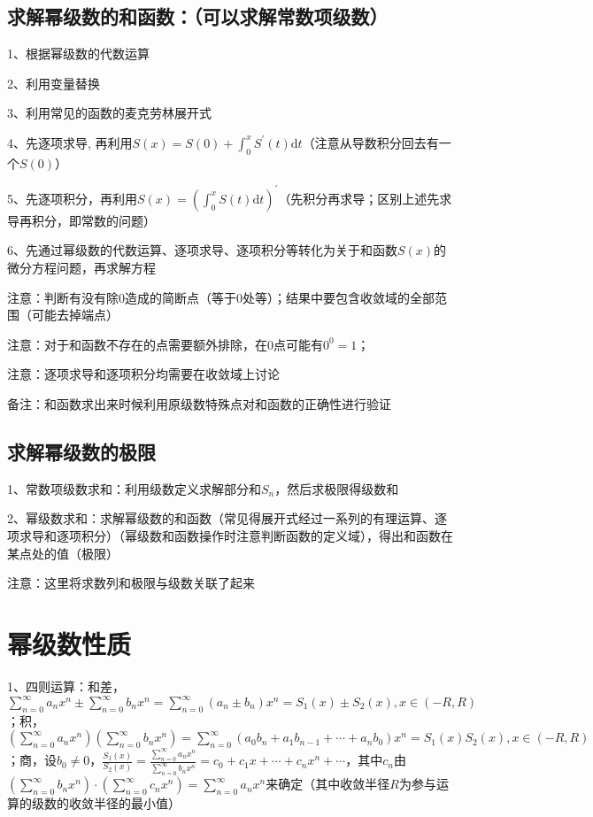 \subsection{求解幂级数的和函数：（可以求解常数项级数）}

1、根据幂级数的代数运算

2、利用变量替换

3、利用常见的函数的麦克劳林展开式

4、先逐项求导, 再利用$S(x)=S(0)+\int_{0}^{x} S^{\prime}(t) \mathrm{d} t$（注意从导数积分回去有一个$S(0)$）

5、先逐项积分，再利用$S(x)=\left(\int_{0}^{x} S(t) \mathrm{d} t\right)^{\prime}$（先积分再求导；区别上述先求导再积分，即常数的问题）

6、先通过幂级数的代数运算、逐项求导、逐项积分等转化为关于和函数$S(x)$的微分方程问题，再求解方程

注意：判断有没有除0造成的简断点（等于0处等）；结果中要包含收敛域的全部范围（可能去掉端点）

注意：对于和函数不存在的点需要额外排除，在0点可能有$0^0=1$；

注意：逐项求导和逐项积分均需要在收敛域上讨论

备注：和函数求出来时候利用原级数特殊点对和函数的正确性进行验证



\subsection{求解幂级数的极限}

1、常数项级数求和：利用级数定义求解部分和$S_n$，然后求极限得级数和

2、幂级数求和：求解幂级数的和函数（常见得展开式经过一系列的有理运算、逐项求导和逐项积分）（幂级数和函数操作时注意判断函数的定义域），得出和函数在某点处的值（极限）

注意：这里将求数列和极限与级数关联了起来

\section{幂级数性质}

1、四则运算：和差，$\sum_{n=0}^{\infty} a_{n} x^{n} \pm \sum_{n=0}^{\infty} b_{n} x^{n}=\sum_{n=0}^{\infty}\left(a_{n} \pm b_{n}\right) x^{n}=S_{1}(x) \pm S_{2}(x), x \in(-R, R)$；积，$\left(\sum_{n=0}^{\infty} a_{n} x^{n}\right)\left(\sum_{n=0}^{\infty} b_{n} x^{n}\right)=\sum_{n=0}^{\infty}\left(a_{0} b_{n}+a_{1} b_{n-1}+\cdots+a_{n} b_{0}\right) x^{n}=S_{1}(x) S_{2}(x), x \in(-R, R) $；商，设$b_0 \ne 0$，$\frac{S_{1}(x)}{S_{2}(x)}=\frac{\sum_{n=0}^{\infty} a_{n} x^{n}}{\sum_{n=0}^{\infty} b_{n} x^{n}}=c_{0}+c_{1} x+\cdots+c_{n} x^{n}+\cdots$，其中$c_{n}$由$\left(\sum_{n=0}^{\infty} b_{n} x^{n}\right) \cdot\left(\sum_{n=0}^{\infty} c_{n} x^{n}\right)=\sum_{n=0}^{\infty} a_{n} x^{n}$来确定（其中收敛半径$R$为参与运算的级数的收敛半径的最小值）

